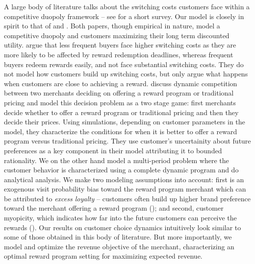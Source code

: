 A large body of literature talks about the switching costs customers face within a competitive duopoly framework -- see \cite{villas2015short} for a short survey.
Our model is closely in spirit to that of \cite{hartmann2008frequency} and \cite{kopalle2001economic}.
Both papers, though empirical in nature, model a competitive duopoly and customers maximizing their long term discounted utility.
\cite{hartmann2008frequency} argue that less frequent buyers face higher switching costs as they are more likely to be affected by reward redemption deadlines, whereas frequent buyers redeem rewards easily, and not face substantial switching costs. 
They do not model how customers build up switching costs, but only argue what happens when customers are close to achieving a reward.
\cite{kopalle2001economic} discuss dynamic competition between two merchants deciding on offering a reward program or traditional pricing and model this decision problem as a two stage game: first merchants decide whether to offer a reward program or traditional pricing and then they decide their prices. 
Using simulations, depending on customer parameters in the model, they characterize the conditions for when it is better to offer a reward program versus traditional pricing.
They use customer's uncertainity about future preferences as a key component in their model attributing it to bounded rationality.
We on the other hand model a multi-period problem where the customer behavior is characterized using a complete dynamic program and do analytical analysis.
We make two modeling assumptions into account: first is an exogenous visit probability bias toward the reward program merchant which can be attributed to \emph{excess loyalty} -- customers often build up higher brand preference toward the merchant offering a reward program (\cite{fader1993excess, sharp1997loyalty}); 
and second, customer myopicity, which indicates how far into the future customers can perceive the rewards (\cite{liu2007long,lewis2004influence}).
Our results on customer choice dynamics intuitively look similar to some of those obtained in this body of literature.
But more importantly, we model and optimize the revenue objective of the merchant, characterizing an optimal reward program setting for maximizing expected revenue.
